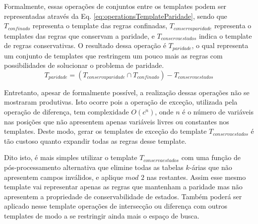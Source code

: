 Formalmente, essas operações de conjuntos entre os templates podem ser representadas através da Eq. \eqref{eq:operationsTemplateParidade}, sendo que $T_{confinado}$ representa o template das regras confinadas, $T_{conservaparidade}$ representa o templates das regras que conservam a paridade, e ${T}_{conservaestados}$ indica o template de regras conservativas. O resultado dessa operação é $T_{paridade}$, o qual representa um conjunto de templates que restringem um pouco mais as regras com possibilidades de solucionar o problema de paridade.
\begin{equation}
T_{paridade} = (T_{conservaparidade} \cap T_{confinado}) - {T}_{conservaestados}
\label{eq:operationsTemplateParidade}
\end{equation}

Entretanto, apesar de formalmente possível, a realização dessas operações não se mostraram produtivas. Isto ocorre pois  a operação de exceção, utilizada pela operação de diferença, tem complexidade $O(c^n)$, onde $n$ é o número de variáveis nas posições que não apresentem apenas variáveis livres ou constantes nos templates. Deste modo, gerar os templates de exceção do template $T_{conservaestados}$ é tão custoso quanto expandir todas as regras desse template.

Dito isto, é mais simples utilizar o template $T_{conservaestados}$ com uma função de pós-processamento alternativa que elimine todas as tabelas $k$-árias que não apresentem campos inválidos, e aplique $mod$ $2$ nas restantes. Assim  esse mesmo template vai representar apenas as regras que mantenham a paridade mas não apresentem a propriedade de conservabilidade de estados. Também poderá ser aplicado nesse template operações de intersecção ou diferença com outros templates de modo a se restringir ainda mais o espaço de busca.